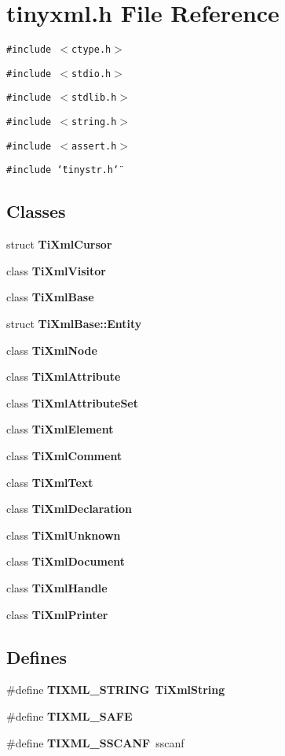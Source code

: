 \section{tinyxml.h File Reference}
\label{tinyxml_8h}


{\tt \#include $<$ctype.h$>$}\par
{\tt \#include $<$stdio.h$>$}\par
{\tt \#include $<$stdlib.h$>$}\par
{\tt \#include $<$string.h$>$}\par
{\tt \#include $<$assert.h$>$}\par
{\tt \#include \char`\"{}tinystr.h\char`\"{}}\par
\subsection*{Classes}
\begin{CompactItemize}
\item 
struct {\bf TiXmlCursor}
\item 
class {\bf TiXmlVisitor}
\item 
class {\bf TiXmlBase}
\item 
struct \textbf{TiXmlBase::Entity}
\item 
class {\bf TiXmlNode}
\item 
class {\bf TiXmlAttribute}
\item 
class {\bf TiXmlAttributeSet}
\item 
class {\bf TiXmlElement}
\item 
class {\bf TiXmlComment}
\item 
class {\bf TiXmlText}
\item 
class {\bf TiXmlDeclaration}
\item 
class {\bf TiXmlUnknown}
\item 
class {\bf TiXmlDocument}
\item 
class {\bf TiXmlHandle}
\item 
class {\bf TiXmlPrinter}
\end{CompactItemize}
\subsection*{Defines}
\begin{CompactItemize}
\item 
\#define {\bf TIXML\_\-STRING}~{\bf TiXmlString}
\item 
\#define {\bf TIXML\_\-SAFE}
\item 
\#define {\bf TIXML\_\-SSCANF}~sscanf
\end{CompactItemize}
